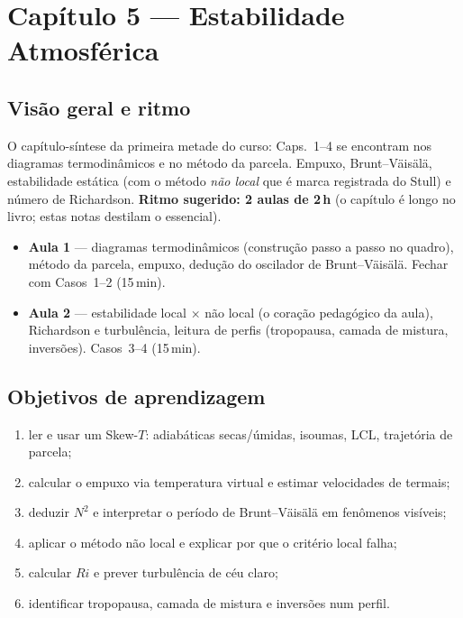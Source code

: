 \section{Capítulo 5 --- Estabilidade Atmosférica}

\subsection*{Visão geral e ritmo}

O capítulo-síntese da primeira metade do curso: Caps.~1--4 se encontram nos
diagramas termodinâmicos e no método da parcela. Empuxo, Brunt--Väisälä,
estabilidade estática (com o método \emph{não local} que é marca registrada
do Stull) e número de Richardson. \textbf{Ritmo sugerido: 2 aulas de 2\,h}
(o capítulo é longo no livro; estas notas destilam o essencial).

\begin{itemize}
  \item \textbf{Aula 1} — diagramas termodinâmicos (construção passo a
        passo no quadro), método da parcela, empuxo, dedução do oscilador
        de Brunt--Väisälä. Fechar com Casos~1--2 (15\,min).
  \item \textbf{Aula 2} — estabilidade local × não local (o coração
        pedagógico da aula), Richardson e turbulência, leitura de perfis
        (tropopausa, camada de mistura, inversões). Casos~3--4 (15\,min).
\end{itemize}

\subsection*{Objetivos de aprendizagem}

\begin{enumerate}
  \item ler e usar um Skew-$T$: adiabáticas secas/úmidas, isoumas, LCL,
        trajetória de parcela;
  \item calcular o empuxo via temperatura virtual e estimar velocidades de
        termais;
  \item deduzir $N^2$ e interpretar o período de Brunt--Väisälä em
        fenômenos visíveis;
  \item aplicar o método não local e explicar por que o critério local
        falha;
  \item calcular $Ri$ e prever turbulência de céu claro;
  \item identificar tropopausa, camada de mistura e inversões num perfil.
\end{enumerate}

